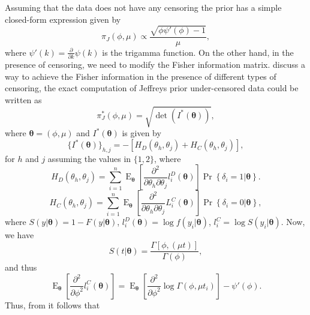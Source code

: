 \documentclass[12pt]{article} %
\newcommand{\f}{\operatorname}
\theoremstyle{plain}%
\theoremstyle{definition}
\theoremstyle{remark}
\begin{document}
Assuming that the data does not have any censoring the prior has a simple closed-form expression given by
\begin{equation*}%
\pi_J\left(\phi,\mu\right)\propto \frac{\sqrt{\phi\psi'(\phi)-1}}{\mu},
\end{equation*}
where $\psi'(k)=\frac{\partial}{\partial k}\psi(k)$ is the trigamma function.
On the other hand, in the presence of censoring, we need to modify the Fisher information matrix. \cite{de2001jeffreys} discuss a way to achieve the Fisher information in the presence of different types of censoring, the exact computation of Jeffreys prior under-censored data could be written as
\begin{equation*}
\pi_J^*\left(\phi,\mu\right)=\sqrt{\det(I^*(\boldsymbol{\theta}))},
\end{equation*}
where $\boldsymbol{\theta}=(\phi,\mu)$ and $I^*(\boldsymbol{\theta})$ is given by
\begin{equation*} \{I^*(\boldsymbol{\theta})\}_{h,j} = -[H_D(\theta_h,\theta_j)+H_C(\theta_h,\theta_j)],
\end{equation*}
for $h$ and $j$ assuming the values in $\{1,2\}$, where
\begin{equation*} 
H_D(\theta_h,\theta_j) = \sum_{i=1}^n \f{E}_{\boldsymbol{\theta}}\left[\frac{\partial^2}{\partial \theta_h\partial \theta_j} l_i^D(\boldsymbol{\theta})\right]\f{Pr}\left\{\delta_i=1|\boldsymbol{\theta}\right\}.
\end{equation*}
\begin{equation*}
H_C(\theta_h,\theta_j) = \sum_{i=1}^n \f{E}_{\boldsymbol{\theta}}\left[\frac{\partial^2}{\partial \theta_h\partial \theta_j} L^C_i(\boldsymbol{\theta})\right]\f{Pr}\left\{\delta_i=0|\boldsymbol{\theta}\right\},
\end{equation*}
where $S(y|\boldsymbol{\theta}) = 1-F(y|\boldsymbol{\theta})$, $l_i^D(\boldsymbol{\theta})=\log f(y_i|\boldsymbol{\theta})$, $l_i^C=\log S(y_i|\boldsymbol{\theta})$. Now, we have
\begin{equation*} 
S(t|\boldsymbol{\theta}) = \frac{\Gamma[\phi,(\mu t)]}{\Gamma(\phi)},
\end{equation*}
and thus
\begin{equation*} \f{E}_{\boldsymbol{\theta}}\left[ \frac{\partial^2}{\partial \phi ^2} l_i^C(\boldsymbol{\theta})\right] = \f{E}_{\boldsymbol{\theta}}\left[ \frac{\partial^2}{\partial \phi ^2} \log \Gamma(\phi,\mu t_i)\right]-\psi'(\phi).
\end{equation*}
Thus, from \cite{1990-Geddes} it follows that
\end{document}
